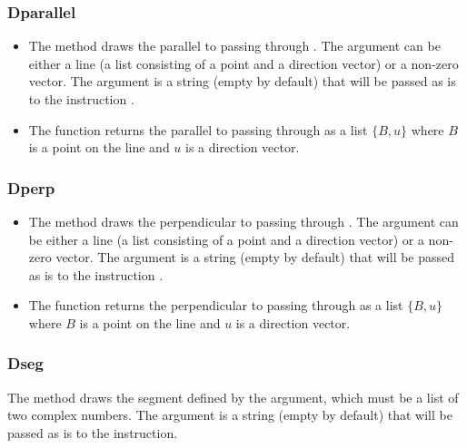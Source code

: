 \subsubsection{Dparallel}
\begin{itemize}
    \item The method  draws the parallel to  passing through . The argument  can be either a line (a list consisting of a point and a direction vector) or a non-zero vector. The argument  is a string (empty by default) that will be passed as is to the instruction \drawcmd. \arguScale
    
    \item The function  returns the parallel to  passing through  as a list $\{B,u\}$ where $B$ is a point on the line and $u$ is a direction vector.
\end{itemize}

\subsubsection{Dperp}
\begin{itemize}
    \item The method  draws the perpendicular to  passing through . The argument  can be either a line (a list consisting of a point and a direction vector) or a non-zero vector. The argument  is a string (empty by default) that will be passed as is to the instruction \drawcmd. \arguScale
    
    \item The function  returns the perpendicular to  passing through  as a list $\{B,u\}$ where $B$ is a point on the line and $u$ is a direction vector.
\end{itemize}

\subsubsection{Dseg}
The  method draws the segment defined by the  argument, which must be a list of two complex numbers. The  argument is a string (empty by default) that will be passed as is to the \drawcmd instruction. \arguScale


